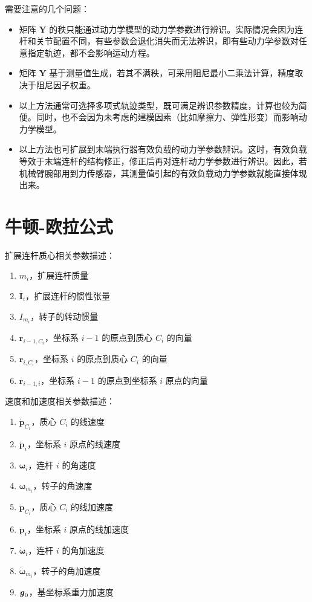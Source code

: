 \documentclass[cn,11pt,chinese,blue,bibstyle=ieeetr]{elegantbook}
\begin{document}
需要注意的几个问题：
\begin{itemize}
\item 矩阵 $\bm{Y}$ 的秩只能通过动力学模型的动力学参数进行辨识。实际情况会因为连杆和关节配置不同，有些参数会退化消失而无法辨识，即有些动力学参数对任意指定轨迹，都不会影响运动方程。
\item 矩阵 $\bm{Y}$ 基于测量值生成，若其不满秩，可采用阻尼最小二乘法计算，精度取决于阻尼因子权重。
\item 以上方法通常可选择多项式轨迹类型，既可满足辨识参数精度，计算也较为简便。同时，也不会因为未考虑的建模因素（比如摩擦力、弹性形变）而影响动力学模型。
\item 以上方法也可扩展到末端执行器有效负载的动力学参数辨识。这时，有效负载等效于末端连杆的结构修正，修正后再对连杆动力学参数进行辨识。因此，若机械臂腕部用到力传感器，其测量值引起的有效负载动力学参数就能直接体现出来。
\end{itemize}


\section{牛顿-欧拉公式}

扩展连杆质心相关参数描述：
\begin{enumerate}
	\item $m_i$，扩展连杆质量
	\item $\bm{\bar{I}}_i$，扩展连杆的惯性张量
	\item $I_{m_i}$，转子的转动惯量
	\item $\bm{r}_{i-1,{C_i}}$，坐标系 $i-1$ 的原点到质心 $C_i$ 的向量
	\item $\bm{r}_{i,{C_i}}$，坐标系 $i$ 的原点到质心 $C_i$ 的向量
	\item $\bm{r}_{i-1,i}$，坐标系 $i-1$ 的原点到坐标系 $i$ 原点的向量
\end{enumerate}

速度和加速度相关参数描述：
\begin{enumerate}
	\item $\bm{\dot{p}}_{C_i}$，质心 $C_i$ 的线速度
	\item $\bm{\dot{p}}_{i}$，坐标系 $i$ 原点的线速度
	\item $\bm{\omega}_{i}$，连杆 $i$ 的角速度
	\item $\bm{\omega}_{m_i}$，转子的角速度
	\item $\bm{\ddot{p}}_{C_i}$，质心 $C_i$ 的线加速度
	\item $\bm{\ddot{p}}_{i}$，坐标系 $i$ 原点的线加速度
	\item $\bm{\dot{\omega}}_{i}$，连杆 $i$ 的角加速度
	\item $\bm{\dot{\omega}}_{m_i}$，转子的角加速度
	\item $\textbf{\textit{g}}_0$，基坐标系重力加速度
\end{enumerate}
\end{document}
